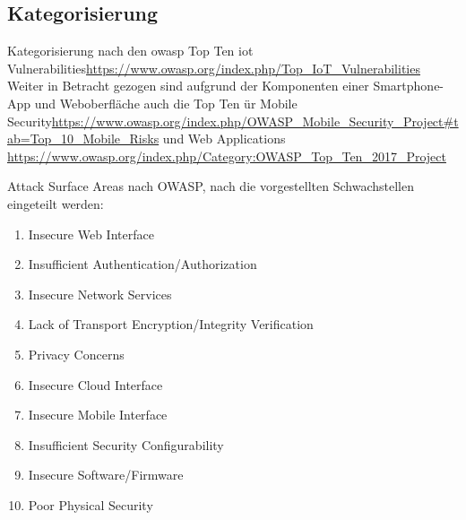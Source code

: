\subsection{Kategorisierung}
    Kategorisierung nach den \gls{owasp} Top Ten \gls{iot} Vulnerabilities\sloppy\url{https://www.owasp.org/index.php/Top_IoT_Vulnerabilities}
    Weiter in Betracht gezogen sind aufgrund der Komponenten einer Smartphone-App und Weboberfläche auch die Top Ten ür Mobile Security\sloppy\url{https://www.owasp.org/index.php/OWASP_Mobile_Security_Project#tab=Top_10_Mobile_Risks} und Web Applications \sloppy\url{https://www.owasp.org/index.php/Category:OWASP_Top_Ten_2017_Project}
    
    
    Attack Surface Areas nach OWASP, nach die vorgestellten Schwachstellen eingeteilt werden:
    \begin{enumerate}[noitemsep]
        \item Insecure Web Interface
        \item Insufficient Authentication/Authorization
        \item Insecure Network Services
        \item Lack of Transport Encryption/Integrity Verification
        \item Privacy Concerns
        \item Insecure Cloud Interface
        \item Insecure Mobile Interface
        \item Insufficient Security Configurability
        \item Insecure Software/Firmware
        \item Poor Physical Security
    \end{enumerate}